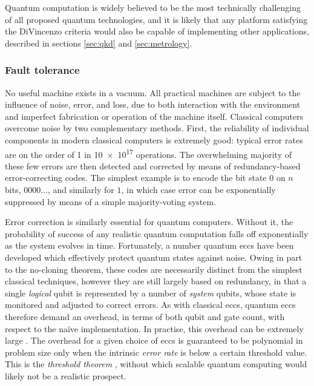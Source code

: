 Quantum computation is widely believed to be the most technically challenging of all proposed quantum technologies, and it is likely that any platform satisfying the DiVincenzo criteria would also be capable of implementing other applications, described in sections \ref{sec:qkd} and \ref{sec:metrology}.

\subsubsection{Fault tolerance} 
\label{sec:errors-in-quantum-computers}
No useful machine exists in a vacuum. All practical machines are subject to the influence of noise, error, and loss, due to both interaction with the environment and imperfect fabrication or operation of the machine itself. Classical computers overcome noise by two complementary methods. First, the reliability of individual components in modern classical computers is extremely good: typical error rates are on the order of 1 in \num{10e17} operations. The overwhelming majority of these few errors are then detected and corrected by means of redundancy-based error-correcting codes. The simplest example is to encode the bit state $0$ on $n$ bits, $0000\ldots$, and similarly for $1$, in which case error can be exponentially suppressed by means of a simple majority-voting system.

Error correction is similarly essential for quantum computers. Without it, the probability of success of any realistic quantum computation falls off exponentially as the system evolves in time. Fortunately, a number quantum \glspl{ecc} \cite{Raussendorf2001, Raussendorf2003, Shor1995a, Nielsen2004} have been developed which effectively protect quantum states against noise. Owing in part to the no-cloning theorem, these codes are necessarily distinct from the simplest classical techniques, however they are still largely based on redundancy, in that a single \emph{logical} qubit is represented by a number of \emph{system} qubits, whose state is monitored and adjusted to correct errors. 
As with classical \glspl{ecc}, quantum \glspl{ecc} therefore demand an overhead, in terms of both qubit and gate count, with respect to the na\"ive implementation. In practise, this overhead can be extremely large \cite{Devitt2012}.  The overhead for a given choice of \glspl{ecc} is guaranteed to be polynomial in problem size only when the intrinsic \emph{error rate} is below a certain threshold value. This is the \emph{threshold theorem} \cite{Gottesman2009}, without which scalable quantum computing would likely not be a realistic prospect.

